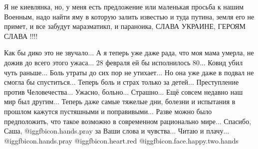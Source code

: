 \begin{itemize}
Я не киевлянка, но, у меня есть предложение или маленькая просьба к нашим
Военным, надо найти яму в которую залить известью и туда путина, земля его не
примет, и все забудут маразматикп, и параноика, СЛАВА УКРАИНЕ, ГЕРОЯМ СЛАВА
!!!!

\obeycr
Как бы дико это не звучало...
А я теперь уже даже рада, что моя мама умерла, не дожив до всего этого ужаса...
28 февраля ей бы исполнилось 80...
Ковид убил чуть раньше...
Боль утраты до сих пор не утихает...
Но она уже даже в подвал не смогла бы спуститься...
Теперь боль и страх только за детей...
Преступление против Человечества...
Ужасно, больно...
Страшно...
Ещё совсем недавно наш мир был другим...
Теперь даже самые тяжелые дни, болезни и испытания в прошлом кажутся пустяшными и поправивыми...
Разве можно было предположить, что такое возможно в современном рационально мире...
Спасибо, Саша,  @igg{fbicon.hands.pray}  за Ваши слова и чувства...
Читаю и плачу...
 @igg{fbicon.hands.pray} @igg{fbicon.heart.red} @igg{fbicon.face.happy.two.hands} 
\restorecr

\end{itemize} %
